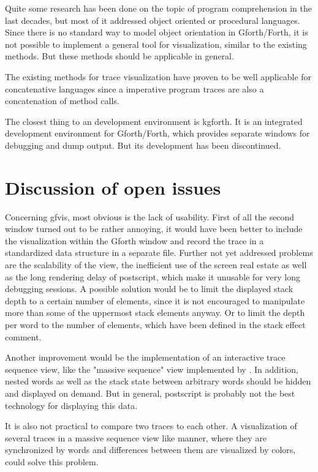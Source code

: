 Quite some research has been done on the topic of program comprehension in the last decades, but most of it addressed object oriented or procedural languages. Since there is no standard way to model object orientation in Gforth/Forth, it is not possible to implement a general tool for visualization, similar to the existing methods. But these methods should be applicable in general.

The existing methods for trace visualization have proven to be well applicable for concatenative languages since a imperative program traces are also a concatenation of method calls.

The closest thing to an development environment is kgforth. It is an integrated development environment for Gforth/Forth, which provides separate windows for debugging and dump output. But its development has been discontinued.

\section{Discussion of open issues}

Concerning gfvis, most obvious is the lack of usability. First of all the second window turned out to be rather annoying, it would have been better to include the visualization within the Gforth window and record the trace in a standardized data structure in a separate file.
Further not yet addressed problems are the scalability of the view, the inefficient use of the screen real estate as well as the long rendering delay of postscript, which make it unusable for very long debugging sessions. A possible solution would be to limit the displayed stack depth to a certain number of elements, since it is not encouraged to manipulate more than some of the uppermost stack elements anyway. Or to limit the depth per word to the number of elements, which have been defined in the stack effect comment.

Another improvement would be the implementation of an interactive trace sequence view, like the "massive sequence" view implemented by \cite{Cornelissen:2008:ETA:1454787.1454981}. In addition, nested words as well as the stack state between arbitrary words should be hidden and displayed on demand. But in general, postscript is probably not the best technology for displaying this data.

It is also not practical to compare two traces to each other. A visualization of several traces in a massive sequence view like manner, where they are synchronized by words and differences between them are visualized by colors, could solve this problem.

